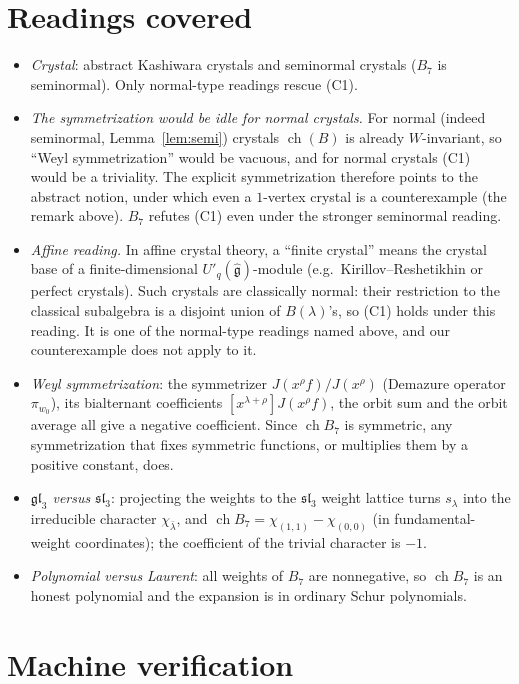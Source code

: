 \documentclass[11pt]{article}
\theoremstyle{definition}
\theoremstyle{remark}
\newcommand{\ch}{\operatorname{ch}}
\begin{document}
\section{Readings covered}\label{sec:readings}
\begin{itemize}
\item \emph{Crystal}: abstract Kashiwara crystals and seminormal crystals ($B_7$ is
seminormal). Only normal-type readings rescue (C1).
\item \emph{The symmetrization would be idle for normal crystals.} For normal (indeed
seminormal, Lemma~\ref{lem:semi}) crystals $\ch(B)$ is already $W$-invariant, so ``Weyl
symmetrization'' would be vacuous, and for normal crystals (C1) would be a triviality. The explicit
symmetrization therefore points to the abstract notion, under which even a $1$-vertex crystal is
a counterexample (the remark above). $B_7$ refutes (C1) even under the stronger seminormal
reading.
\item \emph{Affine reading.} In affine crystal theory, a ``finite crystal'' means the crystal
base of a finite-dimensional $U'_q(\hat{\mathfrak g})$-module (e.g.\ Kirillov--Reshetikhin or
perfect crystals). Such crystals are classically normal: their restriction to the classical
subalgebra is a disjoint union of $B(\lambda)$'s, so (C1) holds under this reading. It is one of
the normal-type readings named above, and our counterexample does not apply to it.
\item \emph{Weyl symmetrization}: the symmetrizer $J(x^\rho f)/J(x^\rho)$ (Demazure operator
$\pi_{w_0}$), its bialternant coefficients $[x^{\lambda+\rho}]J(x^\rho f)$, the orbit sum and
the orbit average all give a negative coefficient. Since $\ch B_7$ is symmetric, any
symmetrization that fixes symmetric functions, or multiplies them by a positive constant, does.
\item \emph{$\mathfrak{gl}_3$ versus $\mathfrak{sl}_3$}: projecting the weights to the
$\mathfrak{sl}_3$ weight lattice turns $s_\lambda$ into the irreducible character
$\chi_{\bar\lambda}$, and $\ch B_7=\chi_{(1,1)}-\chi_{(0,0)}$ (in fundamental-weight
coordinates); the coefficient of the trivial character is $-1$.
\item \emph{Polynomial versus Laurent}: all weights of $B_7$ are nonnegative, so $\ch B_7$ is
an honest polynomial and the expansion is in ordinary Schur polynomials.
\end{itemize}

\section{Machine verification}
\end{document}
